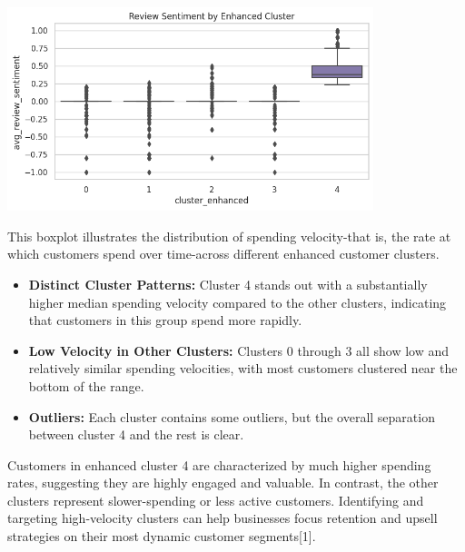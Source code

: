 \documentclass[a4paper]{article}
\begin{document}
\begin{multicols}{2}
\noindent
\begin{minipage}{\columnwidth}
\centering
\includegraphics[width=0.8\textwidth]{plots/Spending Velocity by Enhanced Cluster.png}
\label{fig:spending_velocity_enhanced}
\end{minipage}

This boxplot illustrates the distribution of spending velocity-that is, the rate at which customers spend over time-across different enhanced customer clusters.

\begin{itemize}
    \item \textbf{Distinct Cluster Patterns:} Cluster 4 stands out with a substantially higher median spending velocity compared to the other clusters, indicating that customers in this group spend more rapidly.
    \item \textbf{Low Velocity in Other Clusters:} Clusters 0 through 3 all show low and relatively similar spending velocities, with most customers clustered near the bottom of the range.
    \item \textbf{Outliers:} Each cluster contains some outliers, but the overall separation between cluster 4 and the rest is clear.
\end{itemize}

Customers in enhanced cluster 4 are characterized by much higher spending rates, suggesting they are highly engaged and valuable. In contrast, the other clusters represent slower-spending or less active customers. Identifying and targeting high-velocity clusters can help businesses focus retention and upsell strategies on their most dynamic customer segments[1].




\end{multicols}
\end{document}
